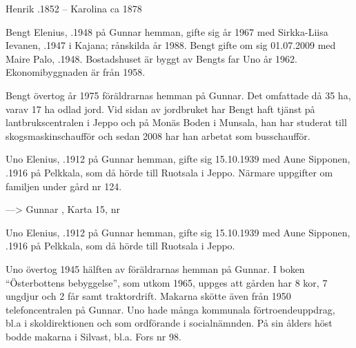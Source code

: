 Henrik .1852  --  Karolina \textdied ca 1878




Bengt Elenius, .1948 på Gunnar hemman, gifte sig år 1967 med Sirkka-Liisa Ievanen, .1947 i Kajana; rånskilda år 1988. Bengt gifte om sig 01.07.2009 med Maire Palo, .1948. Bostadshuset är byggt av Bengts far Uno år 1962. Ekonomibyggnaden är från 1958.
\begin{jhchildren}
  \item {}
  \item {}
  \item {}
\end{jhchildren}
Bengt övertog år 1975 föräldrarnas hemman på Gunnar. Det omfattade då 35 ha, varav 17 ha odlad jord. Vid sidan av jordbruket har Bengt haft tjänst på lantbrukscentralen i Jeppo och på Monäs Boden i Munsala, han har studerat till skogsmaskinschaufför och sedan 2008 har han arbetat som busschaufför.


Uno Elenius, .1912 på Gunnar hemman, gifte sig 15.10.1939 med Aune Sipponen, .1916 på Pelkkala, som då hörde till Ruotsala i Jeppo. Närmare uppgifter om familjen under gård nr 124.


---> Gunnar , Karta 15, nr 


Uno Elenius, .1912 på Gunnar hemman, gifte sig 15.10.1939 med Aune Sipponen, .1916 på Pelkkala, som då hörde till Ruotsala i Jeppo.
\begin{jhchildren}
  \item {}
  \item {}
  \item {}
  \item {}
\end{jhchildren}
Uno övertog 1945 hälften av föräldrarnas hemman på Gunnar. I boken ``Österbottens bebyggelse'', som utkom 1965, uppges att gården har 8 kor, 7 ungdjur och 2 får samt traktordrift. Makarna skötte även från 1950 telefoncentralen på Gunnar. Uno hade många kommunala förtroendeuppdrag, bl.a i skoldirektionen och som ordförande i socialnämnden. På sin ålders höst bodde makarna i Silvast, bl.a. Fors nr 98.

